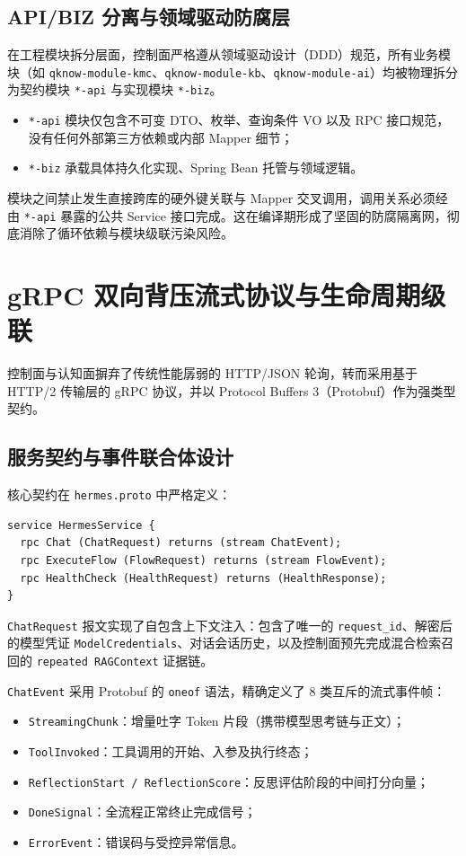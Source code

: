 \subsection{API/BIZ 分离与领域驱动防腐层}
在工程模块拆分层面，控制面严格遵从领域驱动设计（DDD）规范，所有业务模块（如 \texttt{qknow-module-kmc}、\texttt{qknow-module-kb}、\texttt{qknow-module-ai}）均被物理拆分为契约模块 \texttt{*-api} 与实现模块 \texttt{*-biz}。
\begin{itemize}
    \item \texttt{*-api} 模块仅包含不可变 DTO、枚举、查询条件 VO 以及 RPC 接口规范，没有任何外部第三方依赖或内部 Mapper 细节；
    \item \texttt{*-biz} 承载具体持久化实现、Spring Bean 托管与领域逻辑。
\end{itemize}
模块之间禁止发生直接跨库的硬外键关联与 Mapper 交叉调用，调用关系必须经由 \texttt{*-api} 暴露的公共 Service 接口完成。这在编译期形成了坚固的防腐隔离网，彻底消除了循环依赖与模块级联污染风险。

\section{gRPC 双向背压流式协议与生命周期级联}

控制面与认知面摒弃了传统性能孱弱的 HTTP/JSON 轮询，转而采用基于 HTTP/2 传输层的 gRPC 协议，并以 Protocol Buffers 3（Protobuf）作为强类型契约。

\subsection{服务契约与事件联合体设计}
核心契约在 \texttt{hermes.proto} 中严格定义：
\begin{verbatim}
service HermesService {
  rpc Chat (ChatRequest) returns (stream ChatEvent);
  rpc ExecuteFlow (FlowRequest) returns (stream FlowEvent);
  rpc HealthCheck (HealthRequest) returns (HealthResponse);
}
\end{verbatim}

\texttt{ChatRequest} 报文实现了自包含上下文注入：包含了唯一的 \texttt{request\_id}、解密后的模型凭证 \texttt{ModelCredentials}、对话会话历史，以及控制面预先完成混合检索召回的 \texttt{repeated RAGContext} 证据链。

\texttt{ChatEvent} 采用 Protobuf 的 \texttt{oneof} 语法，精确定义了 8 类互斥的流式事件帧：
\begin{itemize}
    \item \texttt{StreamingChunk}：增量吐字 Token 片段（携带模型思考链与正文）；
    \item \texttt{ToolInvoked}：工具调用的开始、入参及执行终态；
    \item \texttt{ReflectionStart / ReflectionScore}：反思评估阶段的中间打分向量；
    \item \texttt{DoneSignal}：全流程正常终止完成信号；
    \item \texttt{ErrorEvent}：错误码与受控异常信息。
\end{itemize}

